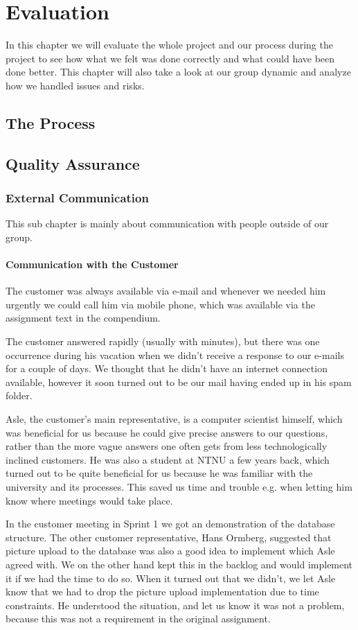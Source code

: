 \chapter{Evaluation}
In this chapter we will evaluate the whole project and our process during the project to see how what we felt was done correctly and what could have been done better. This chapter will also take a look at our group dynamic and analyze how we handled issues and risks.

\newpage
\section{The Process}


\section{Quality Assurance}
\subsection{External Communication}
This sub chapter is mainly about communication with people outside of our group.
\subsubsection{Communication with the Customer}
The customer was always available via e-mail and whenever we needed him urgently we could call him via mobile phone, which was available via the assignment text in the compendium.

The customer answered rapidly (usually with minutes), but there was one occurrence during his vacation when we didn't receive a response to our e-mails for a couple of days. We thought that he didn't have an internet connection available, however it soon turned out to be our mail having ended up in his spam folder.

Asle, the customer's main representative, is a computer scientist himself, which was beneficial for us because he could give precise answers to our questions, rather than the more vague answers one often gets from less technologically inclined customers. He was also a student at NTNU a few years back, which turned out to be quite beneficial for us because he was familiar with the university and its processes. This saved us time and trouble e.g. when letting him know where meetings would take place.

In the customer meeting in Sprint 1 we got an demonstration of the database structure. The other customer representative, Hans Ormberg, suggested that picture upload to the database was also a good idea to implement which Asle agreed with. We on the other hand kept this in the backlog and would implement it if we had the time to do so. When it turned out that we didn't, we let Asle know that we had to drop the picture upload implementation due to time constraints. He understood the situation, and let us know it was not a problem, because this was not a requirement in the original assignment.

